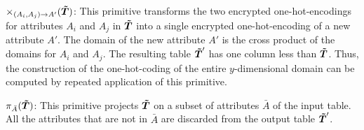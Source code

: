  $\times_{(A_i,A_j)\rightarrow A'}(\boldsymbol{\tilde{T}})$: This primitive transforms the two encrypted one-hot-encodings for attributes $A_i$ and $A_j$ in $\boldsymbol{\tilde{T}}$ into a single encrypted one-hot-encoding of a new attribute $A'$. The domain of the new attribute $A'$ is the cross product of the domains for $A_i$ and $A_j$. The resulting table $\boldsymbol{\tilde{T}}'$ has one column less than $\boldsymbol{\tilde{T}}$. Thus, the construction of the one-hot-coding of the entire $y$-dimensional domain can be computed by repeated application of this primitive. 	

 $\pi_{\bar{A}}(\boldsymbol{\tilde{T}})$: This primitive projects $\boldsymbol{\tilde{T}}$ on  a subset of attributes $\bar{A}$ of the input table. All the attributes that are not in $\bar{A}$ are discarded from the output table $\boldsymbol{\tilde{T}}'$.


